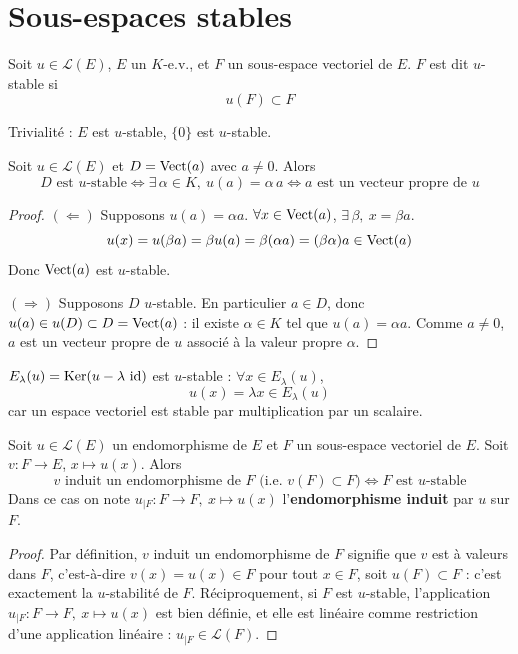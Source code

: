 \section{Sous-espaces stables}

\begin{defi}
Soit $u\in\mathcal{L}(E)$, $E$ un $K$-e.v., et $F$ un sous-espace vectoriel de $E$. $F$ est dit $u$-stable si
\[u(F)\subset F\]
\end{defi}

Trivialité : $E$ est $u$-stable, $\{0\}$ est $u$-stable.

\begin{prop}
\label{prop:droite-stable}
Soit $u\in\mathcal{L}(E)$ et $D=\operatorname{Vect}(a)$ avec $a\neq 0$. Alors
\[D \text{ est } u\text{-stable} \iff \exists\, \alpha\in K,\ u(a)=\alpha\, a \iff a \text{ est un vecteur propre de } u\]
\end{prop}

\begin{proof}
$(\Leftarrow)$ Supposons $u(a)=\alpha a$. $\forall x\in\operatorname{Vect}(a)$, $\exists\, \beta,\ x=\beta a$.
\[u(x) = u(\beta a) = \beta u(a) = \beta(\alpha a) = (\beta\alpha)a \in \operatorname{Vect}(a)\]
Donc $\operatorname{Vect}(a)$ est $u$-stable.

$(\Rightarrow)$ Supposons $D$ $u$-stable. En particulier $a\in D$, donc $u(a)\in u(D)\subset D=\operatorname{Vect}(a)$ : il existe $\alpha\in K$ tel que $u(a)=\alpha a$. Comme $a\neq 0$, $a$ est un vecteur propre de $u$ associé à la valeur propre $\alpha$.
\end{proof}

\begin{exemple}
$E_\lambda(u) = \operatorname{Ker}(u-\lambda\,\operatorname{id})$ est $u$-stable : $\forall x\in E_\lambda(u)$,
\[u(x)=\lambda x \in E_\lambda(u)\]
car un espace vectoriel est stable par multiplication par un scalaire.
\end{exemple}

\begin{prop}
\label{prop:restriction}
Soit $u\in\mathcal{L}(E)$ un endomorphisme de $E$ et $F$ un sous-espace vectoriel de $E$. Soit $v:F\to E$, $x\mapsto u(x)$. Alors
\[v \text{ induit un endomorphisme de } F \text{ (i.e. } v(F)\subset F) \iff F \text{ est } u\text{-stable}\]
Dans ce cas on note $u_{|F} : F\to F,\ x\mapsto u(x)$ l'\textbf{endomorphisme induit} par $u$ sur $F$.
\end{prop}

\begin{proof}
Par définition, $v$ induit un endomorphisme de $F$ signifie que $v$ est à valeurs dans $F$, c'est-à-dire $v(x)=u(x)\in F$ pour tout $x\in F$, soit $u(F)\subset F$ : c'est exactement la $u$-stabilité de $F$. Réciproquement, si $F$ est $u$-stable, l'application $u_{|F}:F\to F,\ x\mapsto u(x)$ est bien définie, et elle est linéaire comme restriction d'une application linéaire : $u_{|F}\in\mathcal{L}(F)$.
\end{proof}

